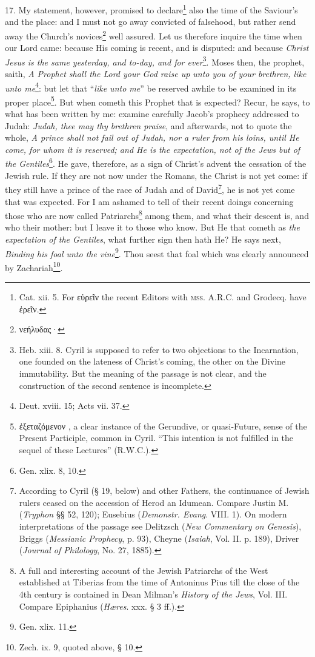 17. My statement, however, promised to declare\footnote{Cat. xii. 5. For \textgreek{εὑρεῖν} the recent Editors with \textsc{mss. A.R.C.} and Grodecq. have \textgreek{ἐρεῖν}.} also the time of the Saviour’s and the place: and I must not go away convicted of falsehood, but rather send away the Church’s novices\footnote{\textgreek{νεήλυδας·}} well assured. Let us therefore inquire the time when our Lord came: because His coming is recent, and is disputed: and because \emph{Christ Jesus is the same yesterday, and to-day, and for ever}\footnote{Heb. xiii. 8. Cyril is supposed to refer to two objections to the Incarnation, one founded on the lateness of Christ’s coming, the other on the Divine immutability. But the meaning of the passage is not clear, and the construction of the second sentence is incomplete.}. Moses then, the prophet, saith, \emph{A Prophet shall the Lord your God raise up unto you of your brethren, like unto me}\footnote{Deut. xviii. 15; Acts vii. 37.}: but let that “\emph{like unto me}” be reserved awhile to be examined in its proper place\footnote{\textgreek{ἐξεταζόμενον} , a clear instance of the Gerundive, or quasi-Future, sense of the Present Participle, common in Cyril. “This intention is not fulfilled in the sequel of these Lectures” (\textsc{R.W.C.}).}. But when cometh this Prophet that is expected? Recur, he says, to what has been written by me: examine carefully Jacob’s prophecy addressed to Judah: \emph{Judah, thee may thy brethren praise}, and afterwards, not to quote the whole, \emph{A prince shall not fail out of Judah, nor a ruler from his loins, until He come, for whom it is reserved; and He is the expectation, not of the Jews but of the Gentiles}\footnote{Gen. xlix. 8, 10.}. He gave, therefore, as a sign of Christ’s advent the cessation of the Jewish rule. If they are not now under the Romans, the Christ is not yet come: if they still have a prince of the race of Judah and of David\footnote{According to Cyril (§ 19, below) and other Fathers, the continuance of Jewish rulers ceased on the accession of Herod an Idumean. Compare Justin M. (\emph{Tryphon} §§ 52, 120); Eusebius (\emph{Demonstr. Evang}. VIII. 1). On modern interpretations of the passage see Delitzsch (\emph{New Commentary on Genesis}), Briggs (\emph{Messianic Prophecy}, p. 93), Cheyne (\emph{Isaiah}, Vol. II. p. 189), Driver (\emph{Journal of Philology}, No. 27, 1885).}, he is not yet come that was expected. For I am ashamed to tell of their recent doings concerning those who are now called Patriarchs\footnote{A full and interesting account of the Jewish Patriarchs of the West established at Tiberias from the time of Antoninus Pius till the close of the 4th century is contained in Dean Milman’s \emph{History of the Jews}, Vol. III. Compare Epiphanius (\emph{Hæres}. xxx. § 3 ff.).} among them, and what their descent is, and who their mother: but I leave it to those who know. But He that cometh as \emph{the expectation of the Gentiles}, what further sign then hath He? He says next, \emph{Binding his foal unto the vine}\footnote{Gen. xlix. 11.}. Thou seest that foal which was clearly announced by Zachariah\footnote{Zech. ix. 9, quoted above, § 10.}.

